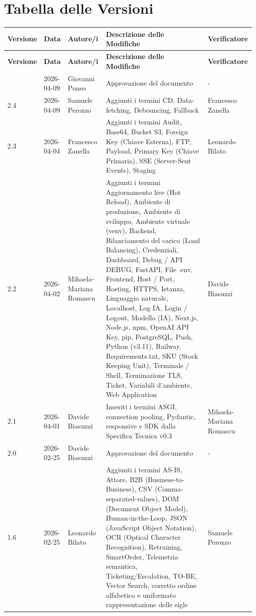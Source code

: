 \documentclass[a4paper, 11pt, oneside]{scrartcl} %
\begin{document}
\section*{Tabella delle Versioni}
\vspace{0.2cm}
{%
\renewcommand{\arraystretch}{1.2}
\setlength{\LTleft}{-0.4cm}
\setlength{\LTright}{0pt}
\begin{longtable}{@{}llp{}p{}p{}@{}}
    \toprule
    \textbf{Versione} & \textbf{Data} & \textbf{Autore/i} & \textbf{Descrizione delle Modifiche} & \textbf{Verificatore} \\
    \midrule
    \endfirsthead
    \toprule
    \textbf{Versione} & \textbf{Data} & \textbf{Autore/i} & \textbf{Descrizione delle Modifiche} & \textbf{Verificatore} \\
    \midrule
    \endhead
    \bottomrule
    \endfoot
    \bottomrule
    \endlastfoot
        3.0 & 2026-04-09 & Giovanni Ponso & Approvazione del documento & - \\
        2.4 & 2026-04-09 & Samuele Perozzo & Aggiunti i termini CD, Data-fetching, Debouncing, Fallback & Francesco Zanella \\
        2.3 & 2026-04-04 & Francesco Zanella & Aggiunti i termini Audit, Base64, Bucket S3, Foreign Key (Chiave Esterna), FTP, Payload, Primary Key (Chiave Primaria), SSE (Server-Sent Events), Staging & Leonardo Bilato \\
        2.2 & 2026-04-02 & Mihaela-Mariana Romascu & Aggiunti i termini Aggiornamento live (Hot Reload), Ambiente di produzione, Ambiente di sviluppo, Ambiente virtuale (venv), Backend, Bilanciamento del carico (Load Balancing), Credenziali, Dashboard, Debug / API DEBUG, FastAPI, File .env, Frontend, Host / Port, Hosting, HTTPS, Istanza, Linguaggio naturale, Localhost, Log IA, Login / Logout, Modello (IA), Next.js, Node.js, npm, OpenAI API Key, pip, PostgreSQL, Push, Python (v3.11), Railway, Requirements.txt, SKU (Stock Keeping Unit), Terminale / Shell, Terminazione TLS, Ticket, Variabili d'ambiente, Web Application & Davide Biasuzzi \\
        2.1 & 2026-04-01 & Davide Biasuzzi & Inseriti i termini ASGI, connection pooling, Pydantic, responsive e SDK dalla Specifica Tecnica v0.3 & Mihaela-Mariana Romascu \\
        2.0 & 2026-02-25 & Davide Biasuzzi & Approvazione del documento & - \\
        1.6 & 2026-02-25 & Leonardo Bilato & Aggiunti i termini AS-IS, Attore, B2B (Business-to-Business), CSV (Comma-separated-values), DOM (Document Object Model), Human-in-the-Loop, JSON (JavaScript Object Notation), OCR (Optical Character Recognition), Retraining, SmartOrder, Telemetria semantica, Ticketing/Escalation, TO-BE, Vector Search, corretto ordine alfabetico e uniformato rappresentazione delle sigle & Samuele Perozzo \\

\end{longtable}}
\end{document}
